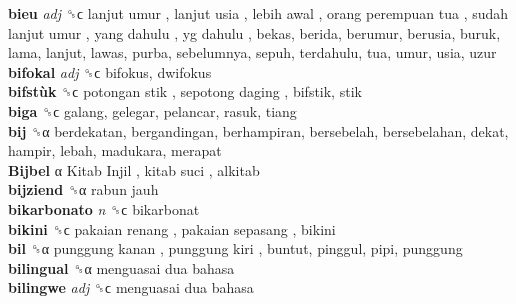 \textbf{bieu} \emph{adj}  ␝ϲ   lanjut umur ,  lanjut usia ,  lebih awal ,  orang perempuan tua ,  sudah lanjut umur ,  yang dahulu ,  yg dahulu , bekas, berida, berumur, berusia, buruk, lama, lanjut, lawas, purba, sebelumnya, sepuh, terdahulu, tua, umur, usia, uzur  \\
\textbf{bifokal} \emph{adj}  ␝ϲ  bifokus, dwifokus  \\
\textbf{bifstùk} ␝ϲ   potongan stik ,  sepotong daging , bifstik, stik  \\
\textbf{biga} ␝ϲ  galang, gelegar, pelancar, rasuk, tiang  \\
\textbf{bij} ␝α  berdekatan, bergandingan, berhampiran, bersebelah, bersebelahan, dekat, hampir, lebah, madukara, merapat  \\
\textbf{Bijbel} α   Kitab Injil ,  kitab suci , alkitab  \\
\textbf{bijziend} ␝α   rabun jauh   \\
\textbf{bikarbonato} \emph{n}  ␝ϲ  bikarbonat  \\
\textbf{bikini} ␝ϲ   pakaian renang ,  pakaian sepasang , bikini  \\
\textbf{bil} ␝α   punggung kanan ,  punggung kiri , buntut, pinggul, pipi, punggung  \\
\textbf{bilingual} ␝α   menguasai dua bahasa   \\
\textbf{bilingwe} \emph{adj}  ␝ϲ   menguasai dua bahasa   \\
